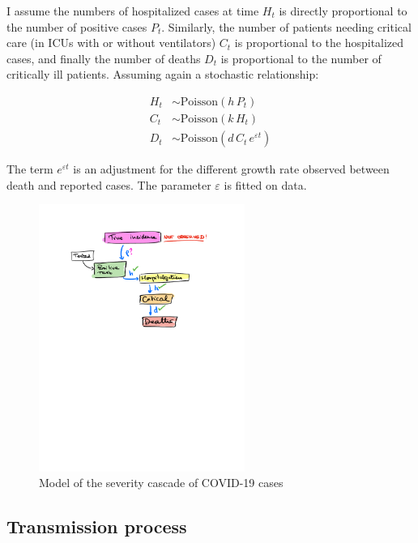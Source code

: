 \documentclass[12pt]{article}
\newcommand{\pois}{\mathrm{Poisson}}
\begin{document}
I assume the numbers of hospitalized cases at time $H_t$ is directly proportional to the number of positive cases $P_t$. Similarly, the number of patients needing critical care (in ICUs with or without ventilators) $C_t$ is proportional to the hospitalized cases, and finally the number of deaths $D_t$ is proportional to the number of critically ill patients. Assuming again a stochastic relationship:

\begin{eqnarray}
H_t & \sim \pois(h\, P_t)\\
C_t & \sim \pois(k\, H_t)\\
D_t & \sim \pois(d\, C_t\, e^{\varepsilon t})
\end{eqnarray}

The term $e^{\varepsilon t}$ is an adjustment for the different growth rate observed between death and reported cases. The parameter $\varepsilon$ is fitted on data. 


\begin{figure}[htbp]
\begin{center}
\includegraphics[width = 0.6\textwidth]{cascade.pdf}
\caption{Model of the severity cascade of COVID-19 cases}
\label{fig:cascade}
\end{center}
\end{figure}




\subsection{Transmission process}
\end{document}
